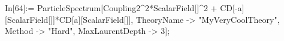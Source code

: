 In[64]:= ParticleSpectrum[Coupling2^2*ScalarField[]^2 + CD[-a][ScalarField[]]*CD[a][ScalarField[]], TheoryName -> "MyVeryCoolTheory", Method -> "Hard", MaxLaurentDepth -> 3]; 